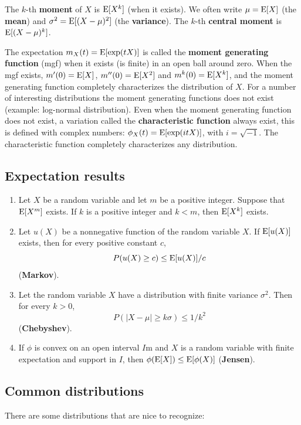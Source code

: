 \documentclass[10pt]{article}
\begin{document}
The $k$-th \textbf{moment} of $X$ is $\operatorname{E} [X^k]$ (when it exists).  We often write $\mu=\operatorname{E}[X]$ (the \textbf{mean}) and
$\sigma^2 = \operatorname{E}[(X-\mu)^2]$ (the \textbf{variance}). The $k$-th \textbf{central moment} 
is $\operatorname{E} [ (X-\mu)^k]$.

The expectation $m_X(t)=\operatorname{E}[\exp(tX)]$ is called the \textbf{moment
generating function} (mgf) when it exists (is finite) in an open ball around zero. When the mgf exists,
$m'(0)=\operatorname{E}[X]$, $m''(0)=\operatorname{E}[X^2]$ and $m^k(0)=\operatorname{E}[X^k]$, and the moment generating function completely
characterizes the distribution of $X$. For a number of interesting distributions the moment generating
functions does not exist (example: log-normal distribution). Even when the moment generating function
does not exist, a variation called the \textbf{characteristic function} always exist, 
this is defined with complex numbers: $\phi_X(t)= \operatorname{E}[\exp(i t X)]$, with  $i = \sqrt{-1}$. 
The characteristic function completely characterizes any distribution. 

\subsection{Expectation results}
\begin{enumerate}
\item Let $X$ be a random variable and let $m$ be a positive integer. 
Suppose that $\operatorname{E}[X^m]$ exists. If $k$ is a positive integer and $k < m$, then
$\operatorname{E}[X^k]$ exists.
\item Let $u(X)$ be a nonnegative function of the random variable $X$. If
$\operatorname{E}[u(X)]$ exists, then for every positive constant $c$,
\[P(u(X)\geq c) \leq \operatorname{E}[u(X)]/c\] (\textbf{Markov}).
\item Let the random variable $X$ have a distribution with
finite variance $\sigma^2$. Then for every $k>0$, 
\[P(|X-\mu|\geq k\sigma) \leq 1/k^2\] (\textbf{Chebyshev}).
\item If $\phi$ is convex on an open interval $I$m and $X$ is a random variable
with finite expectation and support in $I$,
then $ \phi(\operatorname{E}[X]) \leq \operatorname{E}[\phi(X)]$ (\textbf{Jensen}).
\end{enumerate}

\subsection{Common distributions}
There are some distributions that are nice to recognize:
\end{document}
